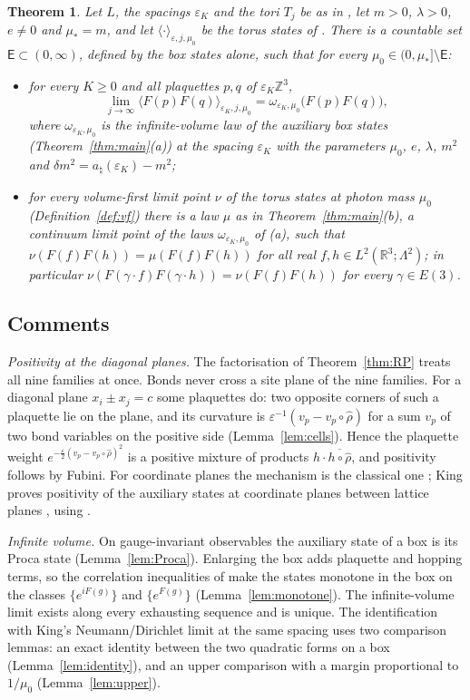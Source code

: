 \documentclass[11pt]{amsart}
\theoremstyle{plain}
\newtheorem{theorem}{Theorem}[section]
\theoremstyle{definition}
\theoremstyle{remark}
\numberwithin{equation}{section}
\newcommand{\R}{\mathbb{R}}
\newcommand{\Z}{\mathbb{Z}}
\newcommand{\eps}{\varepsilon}
\newcommand{\Eu}{E(3)}
\newcommand{\ev}[1]{\langle #1\rangle}
\begin{document}
\begin{theorem}\label{thm:intro-torus}
Let $L$, the spacings $\eps_K$ and the tori $T_j$ be as in \cite[Sect.~2.1]{v1}, let $m>0$, $\lambda>0$, $e\ne0$ and $\mu_*=m$, and let $\ev\cdot_{\eps,j,\mu_0}$ be the torus states of \cite[Def.~2.7]{v1}. There is a countable set $\mathsf E\subset(0,\infty)$, defined by the box states alone, such that for every $\mu_0\in(0,\mu_*]\setminus\mathsf E$:
\begin{itemize}
\item[(a)] for every $K\ge0$ and all plaquettes $p,q$ of $\eps_K\Z^3$,
\[
\lim_{j\to\infty}\ev{F(p)F(q)}_{\eps_K,j,\mu_0}=\omega_{\eps_K,\mu_0}\big(F(p)F(q)\big),
\]
where $\omega_{\eps_K,\mu_0}$ is the infinite-volume law of the auxiliary box states (Theorem~\ref{thm:main}(a)) at the spacing $\eps_K$ with the parameters $\mu_0$, $e$, $\lambda$, $m^2$ and $\delta m^2=a_\natural(\eps_K)-m^2$;
\item[(b)] for every volume-first limit point $\nu$ of the torus states at photon mass $\mu_0$ (Definition~\ref{def:vf}) there is a law $\mu$ as in Theorem~\ref{thm:main}(b), a continuum limit point of the laws $\omega_{\eps_K,\mu_0}$ of (a), such that $\nu(F(f)F(h))=\mu(F(f)F(h))$ for all real $f,h\in L^2(\R^3;\Lambda^2)$; in particular $\nu(F(\gamma\cdot f)F(\gamma\cdot h))=\nu(F(f)F(h))$ for every $\gamma\in\Eu$.
\end{itemize}
\end{theorem}

\subsection{Comments}
\emph{Positivity at the diagonal planes.} The factorisation of Theorem~\ref{thm:RP} treats all nine families at once. Bonds never cross a site plane of the nine families. For a diagonal plane $x_i\pm x_j=c$ some plaquettes do: two opposite corners of such a plaquette lie on the plane, and its curvature is $\eps^{-1}(v_p-v_p\circ\hat\rho)$ for a sum $v_p$ of two bond variables on the positive side (Lemma~\ref{lem:cells}). Hence the plaquette weight $e^{-\frac\eps2(v_p-v_p\circ\hat\rho)^2}$ is a positive mixture of products $h\cdot\overline{h\circ\hat\rho}$, and positivity follows by Fubini. For coordinate planes the mechanism is the classical one \cite[Sect.~2.3, Thm.~2.1]{OS78}; King proves positivity of the auxiliary states at coordinate planes between lattice planes \cite[Prop.~3.3]{K2}, using \cite[Cor.~5.4]{BFS1}.

\emph{Infinite volume.} On gauge-invariant observables the auxiliary state of a box is its Proca state (Lemma~\ref{lem:Proca}). Enlarging the box adds plaquette and hopping terms, so the correlation inequalities of \cite{BFS1} make the states monotone in the box on the classes $\{e^{iF(g)}\}$ and $\{e^{F(g)}\}$ (Lemma~\ref{lem:monotone}). The infinite-volume limit exists along every exhausting sequence and is unique. The identification with King's Neumann/Dirichlet limit at the same spacing uses two comparison lemmas: an exact identity between the two quadratic forms on a box (Lemma~\ref{lem:identity}), and an upper comparison with a margin proportional to $1/\mu_0$ (Lemma~\ref{lem:upper}).
\end{document}
